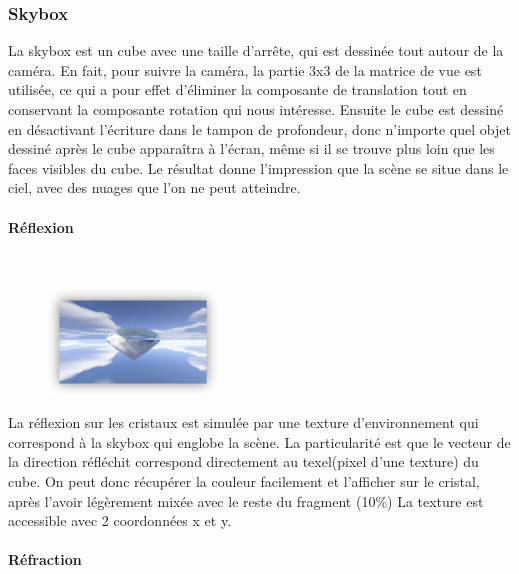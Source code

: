 \documentclass[pdftex, 11pt, a4paper, titlepage]{article}
\begin{document}
\subsubsection{Skybox}

La skybox est un cube avec une taille d'arrête, qui est dessinée tout
 autour de la caméra. En fait, pour suivre la caméra, la partie 3x3 de 
la matrice de vue est utilisée, ce qui a pour effet d'éliminer la
 composante de translation tout en conservant la composante rotation 
qui nous intéresse. Ensuite le cube est dessiné en désactivant l'écriture
 dans le tampon de profondeur, donc n'importe quel objet dessiné après le 
cube apparaîtra à l'écran, même si il se trouve plus loin que les faces
 visibles du cube. Le résultat donne l'impression que la scène se situe
 dans le ciel, avec des nuages que l'on ne peut atteindre.

\paragraph{Réflexion}\mbox{}\\

\begin{figure}
\vspace{-35pt}
\begin{centering}
\includegraphics[width=0.4\textwidth]{ssReflect}
\end{centering}
\vspace{-35pt}
\end{figure}
La réflexion sur les cristaux est simulée par une texture d'environnement 
qui correspond à la skybox qui englobe la scène.
La particularité est que le vecteur de la direction réfléchit correspond 
directement au texel(pixel d'une texture) du cube. On peut donc récupérer
 la couleur facilement et l'afficher sur le cristal, après
l'avoir légèrement mixée avec le reste du fragment (10\%)
La texture est accessible avec 2 coordonnées x et y.

\paragraph{Réfraction}\mbox{}\\
\end{document}
